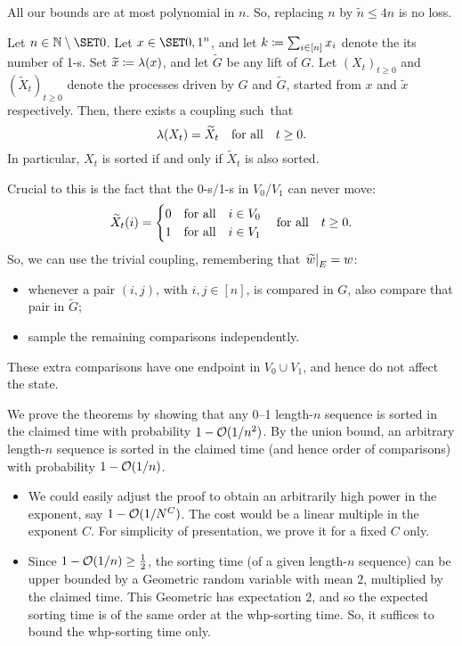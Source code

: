 \documentclass{article}
\newcommand{\wt}{\widetilde}
\begin{document}
All our bounds are at most polynomial in $n$.
So, replacing $n$ by $\wt n \le 4n$ is no loss.

\begin{lem}
Let $n \in \mbn \setminus \set{0}$.
Let $x \in \set{0,1}^n$, and let $k \coloneqq \sum_{i \in [n]} x_i$ denote the its number of 1-s.
Set $\wt x \cq \lambda(x)$, and let $\wt G$ be any lift of $G$.
Let $(X_t)_{t\ge0}$ and $(\wt X_t)_{t\ge0}$ denote the processes driven by $G$ and $\wt G$, started from $x$ and $\wt x$ respectively.
Then, there exists a coupling such~that
\[
	\lambda(X_t)
=
	\wt X_t
\Qforall
	t \ge 0.
\]
In particular,
$X_t$ is sorted if and only if $\wt X_t$ is also sorted.
\end{lem}

\begin{Proof}
Crucial to this is the fact that the 0-s/1-s in $V_0$/$V_1$ can never move:
\[
	\wt X_t(i)
=
\begin{cases}
	0
&\text{for all}\quad
	i \in V_0
\\
	1
&\text{for all}\quad
	i \in V_1
\end{cases}
\Qforall
	t \ge 0.
\]
So, we can use the trivial coupling, remembering that $\fnrestrict{\wt w}{E} = w$:
\begin{itemize}
	\item 
	whenever a pair $(i, j)$, with $i,j \in [n]$, is compared in $G$,
	also compare that pair in $\wt G$;
	
	\item 
	sample the remaining comparisons independently.
\end{itemize}
These extra comparisons have one endpoint in $V_0 \cup V_1$, and hence do not affect the state.
\end{Proof}

We prove the theorems by showing that any 0--1 length-$n$ sequence is sorted in the claimed time with probability $1 - \mathcal{O}( 1/n^2 )$.
By the union bound, an arbitrary length-$n$ sequence is sorted in the claimed time (and hence order of comparisons) with probability $1 - \mathcal{O}( 1/n )$.

\begin{itemize}
	\item 
	We could easily adjust the proof to obtain an arbitrarily high power in the exponent, say $1 - \mathcal{O}( 1/N^C )$.
	The cost would be a linear multiple in the exponent $C$.
	For simplicity of presentation, we prove it for a fixed $C$ only.
	
	\item 
	Since $1 - \mathcal{O}( 1/n ) \ge \tfrac12$, the sorting time (of a given length-$n$ sequence) can be upper bounded by a Geometric random variable with mean $2$, multiplied by the claimed time.
	This Geometric has expectation $2$, and so the expected sorting time is of the same order at the whp-sorting time.
	So, it suffices to bound the whp-sorting time only.
\end{itemize}
\end{document}
